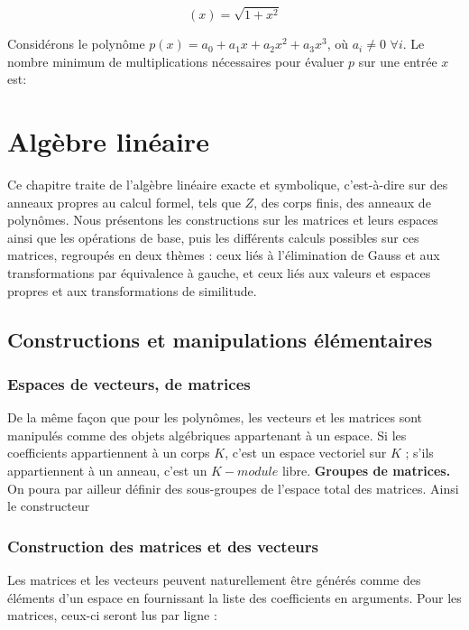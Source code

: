 \begin{example}
\[
 \left(x\right) = \sqrt{1+x^{2}}
\]
\end{example}

\begin{exercise}
Considérons le polynôme $p(x) = a_{0} + a_{1} x + a_{2} x^{2} + a_{3} x^{3}$, où $a_{i} \neq 0$ $\forall i$. Le nombre minimum de multiplications nécessaires pour évaluer $p$ sur une entrée $x$ est:
\end{exercise}
\chapter{Algèbre linéaire}
Ce chapitre traite de l’algèbre linéaire exacte et symbolique, c’est-à-dire sur
des anneaux propres au calcul formel, tels que $Z$, des corps finis, des anneaux de
polynômes. Nous présentons les constructions sur les matrices et leurs espaces ainsi que les
opérations de base, puis les différents calculs possibles sur ces matrices, regroupés en deux thèmes : ceux liés à l’élimination de Gauss et aux transformations par équivalence à gauche, et ceux liés aux valeurs et espaces
propres et aux transformations de similitude.
\section{Constructions et manipulations élémentaires}
\subsection{ Espaces de vecteurs, de matrices}
De la même façon que pour les polynômes, les vecteurs et les matrices sont
manipulés comme des objets algébriques appartenant à un espace. Si les coefficients
appartiennent à un corps $K$, c’est un espace vectoriel sur $K$ ; s’ils appartiennent
à un anneau, c’est un $K-module$ libre.
\textbf{Groupes de matrices.} On poura par ailleur définir des sous-groupes de l'espace total des matrices. Ainsi le constructeur 
\subsection{ Construction des matrices et des vecteurs}
Les matrices et les vecteurs peuvent naturellement être générés comme des éléments d’un espace en fournissant la liste des coefficients en arguments. Pour les matrices, ceux-ci seront lus par ligne :
